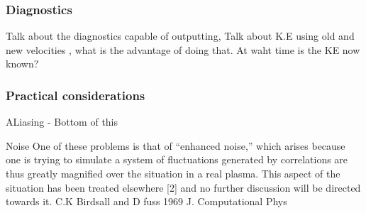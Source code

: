\documentclass[12pt]{article}
\begin{document}
%
%
%
%
\subsubsection{Diagnostics}
Talk about the diagnostics capable of outputting, Talk about K.E using old and new velocities , what is the advantage of doing that. At waht time is the KE now known?
\subsubsection{Practical considerations}
ALiasing - Bottom of this %


Noise One of these problems is that of “enhanced noise,” which arises because one is trying to simulate a system of %
fluctuations generated by correlations are thus greatly magnified over the situation
in a real plasma. This aspect of the situation has been treated elsewhere [2] and
no further discussion will be directed towards it. C.K Birdsall and D fuss 1969 J. Computational Phys 
\end{document}
